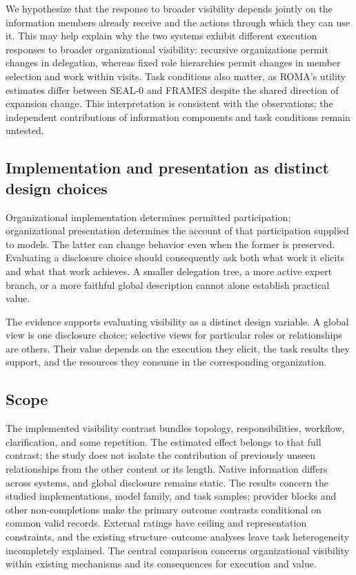 \documentclass[10pt,letterpaper,twocolumn]{article}
\begin{document}
We hypothesize that the response to broad\-er vis\-i\-bil\-i\-ty depends jointly on the in\-for\-ma\-tion members already receive and the actions through which they can use it. This may help explain why the two sys\-tems exhibit dif\-fer\-ent ex\-e\-cu\-tion responses to broad\-er or\-ga\-ni\-za\-tion\-al vis\-i\-bil\-i\-ty: re\-cur\-sive or\-ga\-ni\-za\-tions permit changes in del\-e\-ga\-tion, whereas fixed role hierarchies permit changes in member selection and work within visits. Task conditions also matter, as ROMA's utility es\-ti\-mates differ between SEAL-0 and FRAMES despite the shared direction of ex\-pan\-sion change. This interpretation is consistent with the observations; the independent contributions of in\-for\-ma\-tion components and task conditions remain untested.

\subsection{Implementation and presentation as distinct design choices}
Organizational implementation determines per\-mit\-ted par\-tic\-i\-pa\-tion; or\-ga\-ni\-za\-tion\-al presentation determines the account of that par\-tic\-i\-pa\-tion supplied to mod\-els. The latter can change behavior even when the former is preserved. Evaluating a disclosure choice should consequently ask both what work it elicits and what that work achieves. A smaller del\-e\-ga\-tion tree, a more active expert branch, or a more faithful global de\-scrip\-tion cannot alone establish practical value.

The evidence supports evaluating vis\-i\-bil\-i\-ty as a distinct design variable. A global view is one disclosure choice; selective views for particular roles or relationships are others. Their value depends on the ex\-e\-cu\-tion they elicit, the task results they support, and the resources they consume in the corresponding or\-ga\-ni\-za\-tion.

\subsection{Scope}
The implemented vis\-i\-bil\-i\-ty con\-trast bundles topo\-lo\-gy, responsibilities, workflow, clarification, and some repetition. The estimated effect belongs to that full con\-trast; the study does not isolate the contribution of previously unseen relationships from the other content or its length. Native in\-for\-ma\-tion differs across sys\-tems, and global disclosure remains stat\-ic. The results concern the studied implementations, mod\-el family, and task samples; prov\-id\-er blocks and other non-completions make the primary out\-come con\-trasts conditional on common valid re\-cords. External ratings have ceiling and representation constraints, and the ex\-ist\-ing structure--out\-come analyses leave task heterogeneity incompletely explained. The central comparison concerns or\-ga\-ni\-za\-tion\-al vis\-i\-bil\-i\-ty within ex\-ist\-ing mech\-a\-nisms and its con\-se\-quences for ex\-e\-cu\-tion and value.
\end{document}
